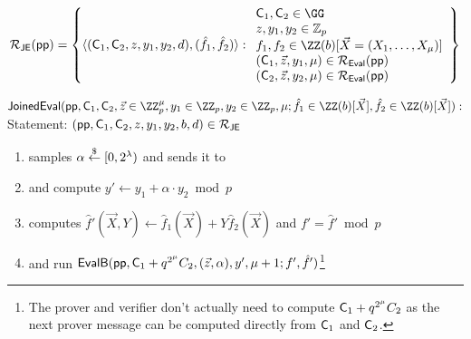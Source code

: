 \[
\mathcal{R_\textsf{JE}}(\params) = \left\lbrace
\langle (\gr{C}_1,\gr{C}_2, z, y_1,y_2,d), (\hat{f}_1, \hat{f}_2) \rangle
: \\
\begin{array}{l} 
\gr{C}_1, \gr{C}_2 \in \GG \\
z, y_1, y_2 \in \mathbb{Z}_p \\
f_1, f_2 \in \ZZ(b)[\vec{X}=(X_1,\dots,X_\mu)] \\
(\gr{C}_1,\vec{z},y_1,\mu) \in \mathcal{R_\textsf{Eval}}(\params) \\
(\gr{C}_2,\vec{z},y_2,\mu) \in \mathcal{R_\textsf{Eval}}(\params)
\end{array}
\right\rbrace
\]





\begin{mdframed}
	$\pro{JoinedEval}(\crs, \gr{C}_1, \gr{C}_2, \vec{z} \in \ZZ_p^\mu, y_1 \in \ZZ_p, y_2 \in \ZZ_p, \mu; \hat{f}_1 \in \ZZ(b)[\vec{X}] ,\hat{f}_2 \in \ZZ(b)[\vec{X}]) :$  \\
Statement: $(\crs,\gr{C}_1,\gr{C}_2,z,y_1,y_2,b,d)\in \mathcal{R}_{\pro{JE}}$
			\begin{enumerate}[nolistsep]
        \item \verifier samples $\alpha \overset{\$}{\gets} [0,2^\lambda)$ and sends it to \prover
			\item \prover and \verifier compute $y'\gets  y_1 + \alpha \cdot y_2 \bmod p$
			\item \prover computes $\hat{f}'(\vec{X},Y)\gets \hat{f}_1(\vec{X}) +Y  \hat{f}_2(\vec{X})$ and $f'=\hat{f}' \bmod p$
			\item \prover and \verifier run $\pro{EvalB}(\params,\gr{C}_1+q^{2^{\mu}}C_2,(\vec{z},\alpha),y',\mu+1;f',\hat{f}')$\footnote{The prover and verifier don't actually need to compute $\gr{C}_1+q^{2^{\mu}}C_2$ as the next prover message can be computed directly from $\gr{C}_1$ and $\gr{C}_2$.}
		    \end{enumerate}
\end{mdframed}

